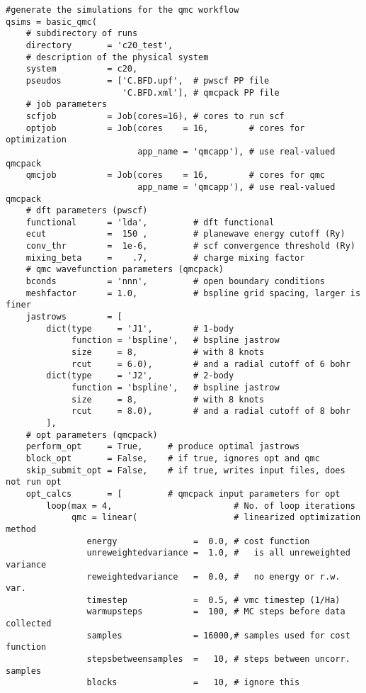 \documentclass[oneside,11pt]{memoir}
\numberwithin{equation}{section}
\begin{document}
\begin{verbatim}
#generate the simulations for the qmc workflow
qsims = basic_qmc(
    # subdirectory of runs 
    directory       = 'c20_test',
    # description of the physical system
    system          = c20,
    pseudos         = ['C.BFD.upf',  # pwscf PP file
                       'C.BFD.xml'], # qmcpack PP file
    # job parameters
    scfjob          = Job(cores=16), # cores to run scf 
    optjob          = Job(cores    = 16,        # cores for optimization 
                          app_name = 'qmcapp'), # use real-valued qmcpack
    qmcjob          = Job(cores    = 16,        # cores for qmc
                          app_name = 'qmcapp'), # use real-valued qmcpack
    # dft parameters (pwscf)
    functional      = 'lda',         # dft functional
    ecut            =  150 ,         # planewave energy cutoff (Ry)
    conv_thr        =  1e-6,         # scf convergence threshold (Ry)
    mixing_beta     =    .7,         # charge mixing factor
    # qmc wavefunction parameters (qmcpack)
    bconds          = 'nnn',         # open boundary conditions
    meshfactor      = 1.0,           # bspline grid spacing, larger is finer
    jastrows        = [
        dict(type     = 'J1',        # 1-body
             function = 'bspline',   # bspline jastrow
             size     = 8,           # with 8 knots
             rcut     = 6.0),        # and a radial cutoff of 6 bohr
        dict(type     = 'J2',        # 2-body
             function = 'bspline',   # bspline jastrow
             size     = 8,           # with 8 knots
             rcut     = 8.0),        # and a radial cutoff of 8 bohr
        ],
    # opt parameters (qmcpack)
    perform_opt     = True,     # produce optimal jastrows
    block_opt       = False,    # if true, ignores opt and qmc
    skip_submit_opt = False,    # if true, writes input files, does not run opt
    opt_calcs       = [         # qmcpack input parameters for opt
        loop(max = 4,                        # No. of loop iterations
             qmc = linear(                   # linearized optimization method
                energy               =  0.0, # cost function
                unreweightedvariance =  1.0, #   is all unreweighted variance
                reweightedvariance   =  0.0, #   no energy or r.w. var. 
                timestep             =  0.5, # vmc timestep (1/Ha)
                warmupsteps          =  100, # MC steps before data collected 
                samples              = 16000,# samples used for cost function 
                stepsbetweensamples  =   10, # steps between uncorr. samples
                blocks               =   10, # ignore this  

\end{verbatim}
\end{document}
